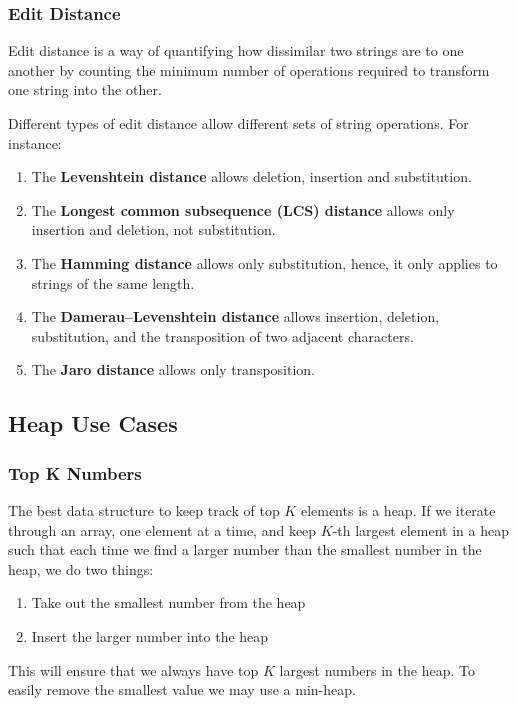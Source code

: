 \documentclass{article}
\begin{document}
    \subsubsection{Edit Distance}
    Edit distance is a way of quantifying how dissimilar two strings are to one another by counting the minimum number of operations required to transform one string into the other. 

    Different types of edit distance allow different sets of string operations. For instance:
    \begin{enumerate}
        \item The \textbf{Levenshtein distance} allows deletion, insertion and substitution.
        \item The \textbf{Longest common subsequence (LCS) distance} allows only insertion and deletion, not substitution.
        \item The \textbf{Hamming distance} allows only substitution, hence, it only applies to strings of the same length.
        \item The \textbf{Damerau–Levenshtein distance} allows insertion, deletion, substitution, and the transposition of two adjacent characters.
        \item The \textbf{Jaro distance} allows only transposition.
    \end{enumerate}
    
    \subsection{Heap Use Cases}
    \subsubsection{Top K Numbers}
    The best data structure to keep track of top $K$ elements is a heap. If we iterate through an array, one element at a time, and keep $K$-th largest element in a heap such that each time we find a larger number than the smallest number in the heap, we do two things:
    \begin{enumerate}
        \item Take out the smallest number from the heap
        \item Insert the larger number into the heap
    \end{enumerate}
    This will ensure that we always have top $K$ largest numbers in the heap. To easily remove the smallest value we may use a min-heap.
\end{document}

